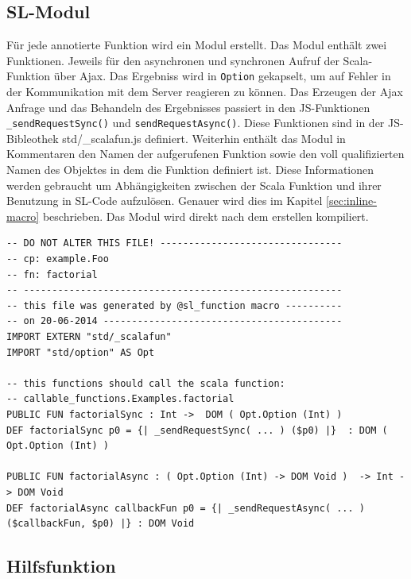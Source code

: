 \documentclass[12pt]{scrreprt}
\begin{document}
\subsection{SL-Modul}
\label{subsec:sl-modul}

Für jede annotierte Funktion wird ein Modul erstellt. Das Modul enthält zwei Funktionen. Jeweils für den asynchronen und synchronen Aufruf der Scala-Funktion über Ajax. Das Ergebniss wird in \lstinline!Option! gekapselt, um auf Fehler in der Kommunikation mit dem Server reagieren zu können. Das Erzeugen der Ajax Anfrage und das Behandeln des Ergebnisses passiert in den \ac{JS}-Funktionen \lstinline!_sendRequestSync()! und \lstinline!sendRequestAsync()!. Diese Funktionen sind in der \ac{JS}-Bibleothek std/\_scalafun.js definiert. Weiterhin enthält das Modul in Kommentaren den Namen der aufgerufenen Funktion sowie den voll qualifizierten Namen des Objektes in dem die Funktion definiert ist. Diese Informationen werden gebraucht um Abhängigkeiten zwischen der Scala Funktion und ihrer Benutzung in \ac{SL}-Code aufzulösen. Genauer wird dies im Kapitel \ref{sec:inline-macro} beschrieben. Das Modul wird direkt nach dem erstellen kompiliert.

\begin{lstlisting}[caption=SL-Modul factorial.sl zur Funktion aus Listing \ref{lst:example-function}, label=lst:example-sl-modul, float=h]
-- DO NOT ALTER THIS FILE! --------------------------------
-- cp: example.Foo
-- fn: factorial
-- --------------------------------------------------------
-- this file was generated by @sl_function macro ----------
-- on 20-06-2014 ------------------------------------------
IMPORT EXTERN "std/_scalafun"
IMPORT "std/option" AS Opt

-- this functions should call the scala function:
-- callable_functions.Examples.factorial
PUBLIC FUN factorialSync : Int ->  DOM ( Opt.Option (Int) )
DEF factorialSync p0 = {| _sendRequestSync( ... ) ($p0) |}  : DOM ( Opt.Option (Int) )

PUBLIC FUN factorialAsync : ( Opt.Option (Int) -> DOM Void )  -> Int -> DOM Void
DEF factorialAsync callbackFun p0 = {| _sendRequestAsync( ... )  ($callbackFun, $p0) |} : DOM Void
\end{lstlisting}

\subsection{Hilfsfunktion}
\label{subsec:helperfunction}
\end{document}

